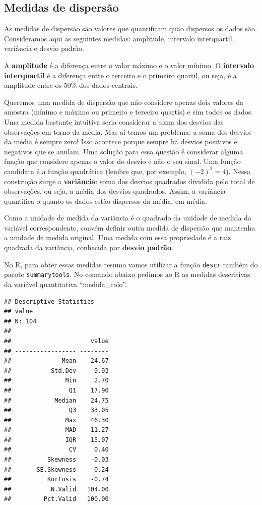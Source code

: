 \documentclass[
]{book}
\newenvironment{Shaded}{\begin{snugshade}}{\end{snugshade}}
\newcommand{\KeywordTok}[1]{\textcolor[rgb]{0.13,0.29,0.53}{\textbf{#1}}}
\newcommand{\NormalTok}[1]{#1}
\newcommand{\OperatorTok}[1]{\textcolor[rgb]{0.81,0.36,0.00}{\textbf{#1}}}
\begin{document}
\hypertarget{medidas-de-dispersuxe3o}{%
\subsection{Medidas de dispersão}\label{medidas-de-dispersuxe3o}}

As medidas de dispersão são valores que quantificam quão dispersos os dados são. Consideramos aqui as seguintes medidas: amplitude, intervalo interquartil, variância e desvio padrão.

A \textbf{amplitude} é a diferença entre o valor máximo e o valor mínimo. O \textbf{intervalo interquartil} é a diferença entre o terceiro e o primeiro quartil, ou seja, é a amplitude entre os 50\% dos dados centrais.

Queremos uma medida de dispersão que não considere apenas dois valores da amostra (mínimo e máximo ou primeiro e terceiro quartis) e sim todos os dados. Uma medida bastante intuitiva seria considerar a soma dos desvios das observações em torno da média. Mas aí temos um problema: a soma dos desvios da média é sempre zero! Isso acontece porque sempre há desvios positivos e negativos que se anulam. Uma solução para essa questão é considerar alguma função que considere apenas o valor do desvio e não o seu sinal. Uma função candidata é a função quadrática (lembre que, por exemplo, \((-2)^2=4\)). Nessa construção surge a \textbf{variância}: soma dos desvios quadrados dividida pelo total de observações, ou seja, a média dos desvios quadrados. Assim, a variância quantifica o quanto os dados estão dispersos da média, em média.

Como a unidade de medida da variância é o quadrado da unidade de medida da variável correspondente, convém definir outra medida de dispersão que mantenha a unidade de medida original. Uma medida com essa propriedade é a raiz quadrada da variância, conhecida por \textbf{desvio padrão}.

No R, para obter essas medidas resumo vamos utilizar a função \texttt{descr} também do pacote \texttt{summarytools}. No comando abaixo pedimos ao R as medidas descritivas da variável quantitativa ``medida\_colo''.

\begin{Shaded}
\end{Shaded}

\begin{verbatim}
## Descriptive Statistics  
## value  
## N: 104  
## 
##                      value
## ----------------- --------
##              Mean    24.67
##           Std.Dev     9.93
##               Min     2.70
##                Q1    17.90
##            Median    24.75
##                Q3    33.05
##               Max    46.30
##               MAD    11.27
##               IQR    15.07
##                CV     0.40
##          Skewness    -0.03
##       SE.Skewness     0.24
##          Kurtosis    -0.74
##           N.Valid   104.00
##         Pct.Valid   100.00
\end{verbatim}
\end{document}
